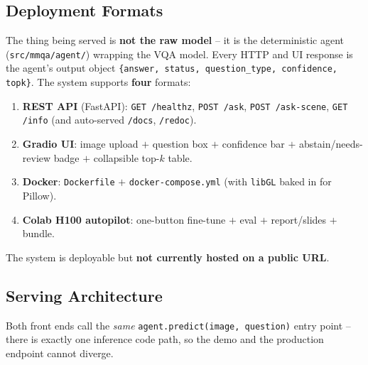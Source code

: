 \documentclass[12pt,a4paper]{article}
\begin{document}
\subsection{Deployment Formats}

The thing being served is \textbf{not the raw model} -- it is the deterministic agent (\texttt{src/mmqa/agent/}) wrapping the VQA model. Every HTTP and UI response is the agent's output object \texttt{\{answer, status, question\_type, confidence, topk\}}. The system supports \textbf{four} formats:
\begin{enumerate}
  \item \textbf{REST API} (FastAPI): \texttt{GET /healthz}, \texttt{POST /ask}, \texttt{POST /ask-scene}, \texttt{GET /info} (and auto-served \texttt{/docs}, \texttt{/redoc}).
  \item \textbf{Gradio UI}: image upload $+$ question box $+$ confidence bar $+$ abstain/needs-review badge $+$ collapsible top-$k$ table.
  \item \textbf{Docker}: \texttt{Dockerfile} $+$ \texttt{docker-compose.yml} (with \texttt{libGL} baked in for Pillow).
  \item \textbf{Colab H100 autopilot}: one-button fine-tune $+$ eval $+$ report/slides $+$ bundle.
\end{enumerate}
The system is deployable but \textbf{not currently hosted on a public URL}.

\subsection{Serving Architecture}

Both front ends call the \emph{same} \texttt{agent.predict(image, question)} entry point -- there is exactly one inference code path, so the demo and the production endpoint cannot diverge.
\end{document}
